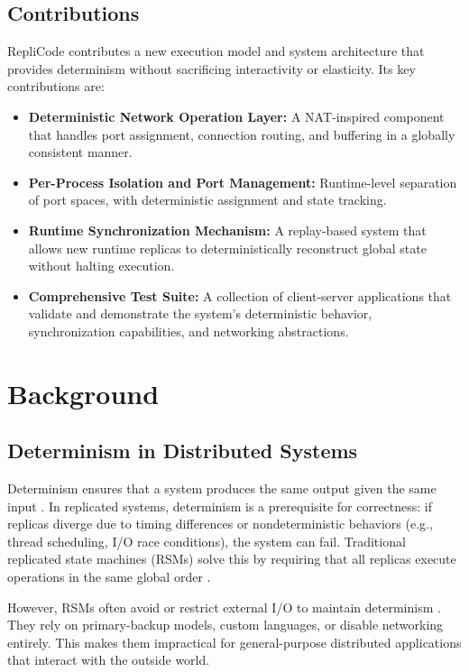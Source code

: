 \documentclass[10pt, 
]{IEEEtran}
\begin{document}
\subsection{Contributions}
RepliCode contributes a new execution model and system architecture that provides determinism without sacrificing interactivity or elasticity. Its key contributions are:

\begin{itemize}
    \item \textbf{Deterministic Network Operation Layer:} A NAT-inspired component that handles port assignment, connection routing, and buffering in a globally consistent manner.
    \item \textbf{Per-Process Isolation and Port Management:} Runtime-level separation of port spaces, with deterministic assignment and state tracking.
    \item \textbf{Runtime Synchronization Mechanism:} A replay-based system that allows new runtime replicas to deterministically reconstruct global state without halting execution.
    \item \textbf{Comprehensive Test Suite:} A collection of client-server applications that validate and demonstrate the system's deterministic behavior, synchronization capabilities, and networking abstractions.
\end{itemize}

\section{Background}

\subsection{Determinism in Distributed Systems}
Determinism ensures that a system produces the same output given the same input \cite{deterministic2010}. In replicated systems, determinism is a prerequisite for correctness: if replicas diverge due to timing differences or nondeterministic behaviors (e.g., thread scheduling, I/O race conditions), the system can fail. Traditional replicated state machines (RSMs) solve this by requiring that all replicas execute operations in the same global order \cite{deterministic2010}.

However, RSMs often avoid or restrict external I/O to maintain determinism \cite{deterministic2009}. They rely on primary-backup models, custom languages, or disable networking entirely. This makes them impractical for general-purpose distributed applications that interact with the outside world.
\end{document}
